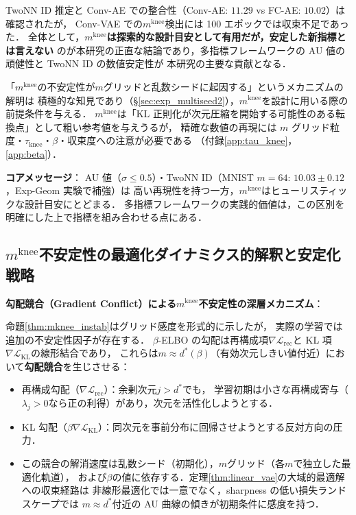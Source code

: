 \documentclass[11pt,a4paper]{jsarticle}
\newcommand{\mknee}{m^{\mathrm{knee}}}
\begin{document}
TwoNN ID 推定と Conv-AE での整合性（Conv-AE: $11.29$ vs FC-AE: $10.02$）は確認されたが，
Conv-VAE での$\mknee$検出には 100 エポックでは収束不足であった．
全体として，\textbf{$\mknee$は探索的な設計目安として有用だが，安定した新指標とは言えない}
のが本研究の正直な結論であり，多指標フレームワークの AU 値の頑健性と TwoNN ID の数値安定性が
本研究の主要な貢献となる．

「$\mknee$の不安定性が$m$グリッドと乱数シードに起因する」というメカニズムの解明は
積極的な知見であり（§\ref{sec:exp_multiseed2}），$\mknee$を設計に用いる際の前提条件を与える．
$\mknee$は「KL 正則化が次元圧縮を開始する可能性のある転換点」として粗い参考値を与えうるが，
精確な数値の再現には $m$ グリッド粒度・$\tau_\mathrm{knee}$・$\beta$・収束度への注意が必要である
（付録\ref{app:tau_knee}，\ref{app:beta}）．

\textbf{コアメッセージ}：
AU 値（$\sigma \leq 0.5$）・TwoNN ID（MNIST $m=64$: $10.03 \pm 0.12$，Exp-Geom 実験で補強）は
高い再現性を持つ一方，$\mknee$はヒューリスティックな設計目安にとどまる．
多指標フレームワークの実践的価値は，この区別を明確にした上で指標を組み合わせる点にある．

\subsection{$\mknee$不安定性の最適化ダイナミクス的解釈と安定化戦略}\label{sec:disc_mknee_improve}

\textbf{勾配競合（Gradient Conflict）による$\mknee$不安定性の深層メカニズム}：

命題\ref{thm:mknee_instab}はグリッド感度を形式的に示したが，
実際の学習では追加の不安定性因子が存在する．
$\beta$-ELBO の勾配は再構成項$\nabla\mathcal{L}_\mathrm{rec}$と
KL 項$\nabla\mathcal{L}_\mathrm{KL}$の線形結合であり，
これらは$m \approx d^*(\beta)$（有効次元しきい値付近）において\textbf{勾配競合}を生じさせる：

\begin{itemize}
  \item 再構成勾配（$\nabla\mathcal{L}_\mathrm{rec}$）：余剰次元$j > d^*$でも，
        学習初期は小さな再構成寄与（$\lambda_j > 0$なら正の利得）があり，次元を活性化しようとする．
  \item KL 勾配（$\beta\nabla\mathcal{L}_\mathrm{KL}$）：同次元を事前分布に回帰させようとする反対方向の圧力．
  \item この競合の解消速度は乱数シード（初期化），$m$グリッド（各$m$で独立した最適化軌道），
        および$\beta$の値に依存する．定理\ref{thm:linear_vae}の大域的最適解への収束経路は
        非線形最適化では一意でなく，sharpness の低い損失ランドスケープでは
        $m \approx d^*$付近の AU 曲線の傾きが初期条件に感度を持つ．
\end{itemize}
\end{document}
